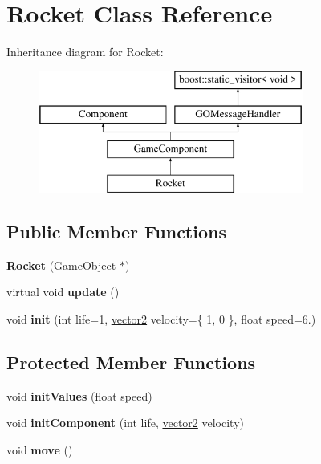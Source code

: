 \hypertarget{class_rocket}{}\section{Rocket Class Reference}
\label{class_rocket}
Inheritance diagram for Rocket\+:\begin{figure}[H]
\begin{center}
\leavevmode
\includegraphics[height=4.000000cm]{class_rocket}
\end{center}
\end{figure}
\subsection*{Public Member Functions}
\begin{DoxyCompactItemize}
\item 
\hypertarget{class_rocket_aa1ab185c1ec59b4983114b41efd59ea0}{}\label{class_rocket_aa1ab185c1ec59b4983114b41efd59ea0} 
{\bfseries Rocket} (\hyperlink{class_game_object}{Game\+Object} $\ast$)
\item 
\hypertarget{class_rocket_aa0f4dcf673358e841e4b4b2fa0b1462e}{}\label{class_rocket_aa0f4dcf673358e841e4b4b2fa0b1462e} 
virtual void {\bfseries update} ()
\item 
\hypertarget{class_rocket_ace1889a9c70f40bafb955dbc48ecc9d0}{}\label{class_rocket_ace1889a9c70f40bafb955dbc48ecc9d0} 
void {\bfseries init} (int life=1, \hyperlink{structvector2}{vector2} velocity=\{ 1, 0 \}, float speed=6.)
\end{DoxyCompactItemize}
\subsection*{Protected Member Functions}
\begin{DoxyCompactItemize}
\item 
\hypertarget{class_rocket_aa73e743c57e1be5dd4c23c3dc5bc498f}{}\label{class_rocket_aa73e743c57e1be5dd4c23c3dc5bc498f} 
void {\bfseries init\+Values} (float speed)
\item 
\hypertarget{class_rocket_a3f444dd351e952656067724b1fc7b1ee}{}\label{class_rocket_a3f444dd351e952656067724b1fc7b1ee} 
void {\bfseries init\+Component} (int life, \hyperlink{structvector2}{vector2} velocity)
\item 
\hypertarget{class_rocket_aa9131c195e7b644b036f745df9b00e94}{}\label{class_rocket_aa9131c195e7b644b036f745df9b00e94} 
void {\bfseries move} ()
\end{DoxyCompactItemize}
